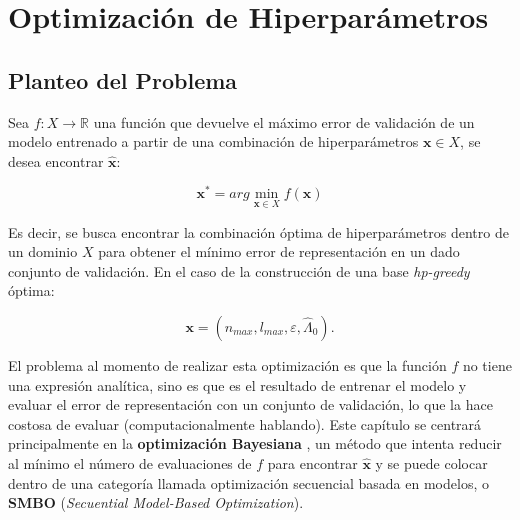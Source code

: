 \chapter{Optimización de Hiperparámetros}

\section{Planteo del Problema}

Sea $f: X \rightarrow \mathbb{R}$ una función que devuelve el máximo error de validación de un modelo entrenado a partir de una combinación de hiperparámetros $\textbf{x} \in X$, se desea encontrar $\hat{\textbf{x}}$:

\[
\textbf{x}^* = arg \min_{\textbf{x} \in X} f(\textbf{x})
\]

Es decir, se busca encontrar la combinación óptima de hiperparámetros dentro de un dominio $X$ para obtener el mínimo error de representación en un dado conjunto de validación. En el caso de la construcción de una base \textit{hp-greedy} óptima: 

\[
\textbf{x} = (n_{max}, l_{max}, \varepsilon, \hat{\Lambda}_0).
\]





El problema al momento de realizar esta optimización es que la función $f$ no tiene una expresión analítica, sino es que es el resultado de entrenar el modelo y evaluar el error de representación con un conjunto de validación, lo que la hace costosa de evaluar (computacionalmente hablando). Este capítulo se centrará principalmente en la \textbf{optimización Bayesiana} \cite{7352306, https://doi.org/10.48550/arxiv.1012.2599}, un método que intenta reducir al mínimo el número de evaluaciones de $f$ para encontrar $\hat{\textbf{x}}$ y se puede colocar dentro de una categoría llamada optimización secuencial basada en modelos, o \textbf{SMBO}\cite{dewancker2015bayesian,NIPS2011_86e8f7ab} (\textit{Secuential Model-Based Optimization}).


